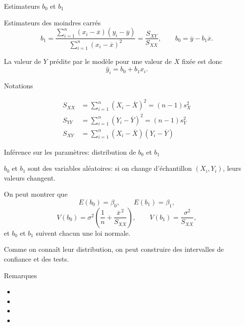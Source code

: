 \documentclass{BeamerTemplate}
\begin{document}
\begin{frame}[t]{Estimateurs $b_0$ et $b_1$}

\begin{Boite}{Estimateurs des moindres carrés}
\[
b_1=\frac{\sum_{i=1}^{n}(x_i-\overline{x})(y_i-\overline{y})}
{\sum_{i=1}^{n}(x_i-\overline{x})^2}=\frac{S_{XY}}{S_{XX}},
\qquad
b_0=\overline{y}-b_1\overline{x}.
\]
\end{Boite}

\medskip
La valeur de $Y$ prédite par le modèle pour une valeur de $X$ fixée est donc
\[
\hat y_i=b_0+b_1x_i.
\]

\end{frame}

\begin{frame}[t]{Notations}

\vspace{5mm}
\begin{align*}
S_{XX}&=\sum_{i=1}^{n}(X_i-\overline{X})^2=(n-1)s_X^2\\[3mm]
S_{YY}&=\sum_{i=1}^{n}(Y_i-\overline{Y})^2=(n-1)s_Y^2\\[3mm]
S_{XY}&=\sum_{i=1}^{n}(X_i-\overline{X})(Y_i-\overline{Y})
\end{align*}

\end{frame}

\begin{frame}[t]{Inférence sur les paramètres: distribution de $b_0$ et $b_1$}

$b_0$ et $b_1$ sont des \alert{variables aléatoires}: si on change d'échantillon
$(X_i,Y_i)$, leurs valeurs changent.

\begin{thm}
On peut montrer que
\[
E(b_0)=\beta_0,\qquad E(b_1)=\beta_1,
\]
\[
V(b_0)=\sigma^2\left(\frac1n+\frac{\overline{x}^{\,2}}{S_{XX}}\right),\qquad
V(b_1)=\frac{\sigma^2}{S_{XX}},
\]
et $b_0$ et $b_1$ suivent chacun une loi normale.
\end{thm}

Comme on connaît leur distribution, on peut construire des intervalles de
confiance et des tests.

\end{frame}

\begin{frame}[t]{Remarques}

\begin{itemize}\itemsep1.5cm
  \item
  \item
  \item
  \item
\end{itemize}

\end{frame}
\end{document}
